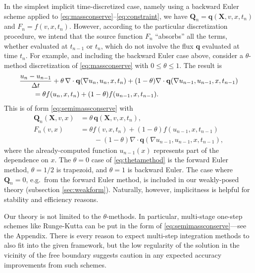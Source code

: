 \documentclass[final,leqno,onefignum,onetabnum]{siamltex1213bueler}
\newcommand\bq{\mathbf{q}}
\newcommand\bQ{\mathbf{Q}}
\newcommand\bX{\mathbf{X}}
\newcommand{\Div}{\nabla\cdot}
\renewcommand{\grad}{\nabla}
\begin{document}
In the simplest implicit time-discretized case, namely using a backward Euler scheme applied to \eqref{eq:massconserve}--\eqref{eq:constraint}, we have $\bQ_n = \bq(\bX,v,x,t_n)$ and $F_n = f(v,x,t_n)$.  However, according to the particular discretization procedure, we intend that the source function $F_n$ ``absorbs'' all the terms, whether evaluated at $t_{n-1}$ or $t_n$, which do not involve the flux $\bq$ evaluated at time $t_n$.  For example, and including the backward Euler case above, consider a $\theta$-method discretization of \eqref{eq:massconserve} with $0\le \theta \le 1$.  The result is
\begin{align}
  &\frac{u_n - u_{n-1}}{\Delta t} + \theta\, \Div \bq(\grad u_n,u_n,x,t_n) + (1-\theta) \Div \bq(\grad u_{n-1},u_{n-1},x,t_{n-1}) \label{eq:thetamethod} \\
  &\qquad =  \theta f(u_n,x,t_n) + (1-\theta) f(u_{n-1},x,t_{n-1}). \notag
\end{align}
This is of form \eqref{eq:semimassconserve} with
\begin{align*}
\bQ_n(\bX,v,x) &= \theta\, \bq(\bX,v,x,t_n), \\
F_n(v,x)       &= \theta f(v,x,t_n) + (1-\theta) f(u_{n-1},x,t_{n-1}) \\
               &\qquad - (1-\theta) \Div \bq(\grad u_{n-1},u_{n-1},x,t_{n-1}),
\end{align*}
where the already-computed function $u_{n-1}(x)$ represents part of the dependence on $x$.  The $\theta=0$ case of \eqref{eq:thetamethod} is the forward Euler method, $\theta=1/2$ is trapezoid, and $\theta=1$ is backward Euler.  The case where $\bQ_n=0$, e.g.~from the forward Euler method, is included in our weakly-posed theory (subsection \ref{sec:weakform}).  Naturally, however, implicitness is helpful for stability and efficiency reasons.

Our theory is not limited to the $\theta$-methods.  In particular, multi-stage one-step schemes like Runge-Kutta can be put in the form of \eqref{eq:semimassconserve}---see the Appendix.  There is every reason to expect multi-step integration methods to also fit into the given framework, but the low regularity of the solution in the vicinity of the free boundary suggests caution in any expected accuracy improvements from such schemes.
\end{document}
